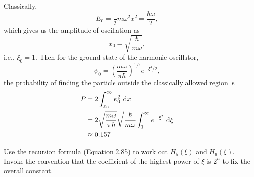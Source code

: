 \documentclass[en, oneside]{vivi}
\begin{document}
\begin{sol}
    Classically, 
    \begin{equation*}
        E_0 = \frac{1}{2} m \omega^2 x^2 = \frac{\hbar \omega}{2},
    \end{equation*}
    which gives us the amplitude of oscillation as
    \begin{equation*}
        x_0 = \sqrt{\frac{\hbar}{m \omega}},
    \end{equation*}
    i.e., $\xi_0 = 1$. Then for the ground state of the harmonic oscillator, 
    \begin{equation*}
        \psi_0 = \left( \frac{m \omega}{\pi \hbar} \right)^{1/4} e^{-\xi^2/2},
    \end{equation*}
    the probability of finding the particle outside the classically allowed region is
    \begin{align*}
        P &= 2 \int_{x_0}^{\infty} \psi_0^2 \dif x\\
        &= 2 \sqrt{\frac{m \omega}{\pi \hbar}} \sqrt{\frac{\hbar}{m \omega}} \int_{1}^{\infty} e^{-\xi^2} \dif \xi\\
        &\approx 0.157
    \end{align*}
\end{sol}

\begin{prob}
    Use the recursion formula (Equation 2.85) to work out $H_5(\xi)$ and $H_6(\xi)$. 
    Invoke the convention that the coefficient of the highest power of $\xi$ is $2^n$ to fix the overall constant.
\end{prob}
\end{document}
